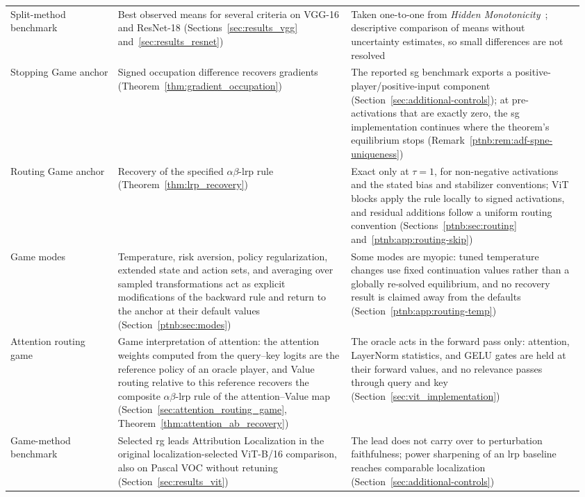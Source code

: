 {\begin{longtable}{@{}>{\raggedright\arraybackslash}p{0.18\linewidth}>{\raggedright\arraybackslash}p{0.39\linewidth}>{\raggedright\arraybackslash}p{0.39\linewidth}@{}}
\addlinespace
Split-method benchmark & Best observed means for several criteria on VGG-16 and ResNet-18 (Sections~\ref{sec:results_vgg} and~\ref{sec:results_resnet}) & Taken one-to-one from \emph{Hidden Monotonicity}~\parencite{hiddenMono}; descriptive comparison of means without uncertainty estimates, so small differences are not resolved \\
\addlinespace
Stopping Game anchor & Signed occupation difference recovers gradients (Theorem~\ref{thm:gradient_occupation}) & The reported \acs{sg} benchmark exports a positive-player/positive-input component (Section~\ref{sec:additional-controls}); at pre-activations that are exactly zero, the \acs{sg} implementation continues where the theorem's equilibrium stops (Remark~\ref{ptnb:rem:adf-spne-uniqueness}) \\
\addlinespace
Routing Game anchor & Recovery of the specified $\alpha\beta$-\acs{lrp} rule (Theorem~\ref{thm:lrp_recovery}) & Exact only at $\tau=1$, for non-negative activations and the stated bias and stabilizer conventions; ViT blocks apply the rule locally to signed activations, and residual additions follow a uniform routing convention (Sections~\ref{ptnb:sec:routing} and~\ref{ptnb:app:routing-skip}) \\
\addlinespace
Game modes & Temperature, risk aversion, policy regularization, extended state and action sets, and averaging over sampled transformations act as explicit modifications of the backward rule and return to the anchor at their default values (Section~\ref{ptnb:sec:modes}) & Some modes are myopic: tuned temperature changes use fixed continuation values rather than a globally re-solved equilibrium, and no recovery result is claimed away from the defaults (Section~\ref{ptnb:app:routing-temp}) \\
\addlinespace
Attention routing game & Game interpretation of attention: the attention weights computed from the query--key logits are the reference policy of an oracle player, and Value routing relative to this reference recovers the composite $\alpha\beta$-\acs{lrp} rule of the attention--Value map (Section~\ref{sec:attention_routing_game}, Theorem~\ref{thm:attention_ab_recovery}) & The oracle acts in the forward pass only: attention, LayerNorm statistics, and GELU gates are held at their forward values, and no relevance passes through query and key (Section~\ref{sec:vit_implementation}) \\
\addlinespace
Game-method benchmark & Selected \acs{rg} leads Attribution Localization in the original localization-selected ViT-B/16 comparison, also on Pascal VOC without retuning (Section~\ref{sec:results_vit}) & The lead does not carry over to perturbation faithfulness; power sharpening of an \acs{lrp} baseline reaches comparable localization (Section~\ref{sec:additional-controls}) \\

\end{longtable}}
